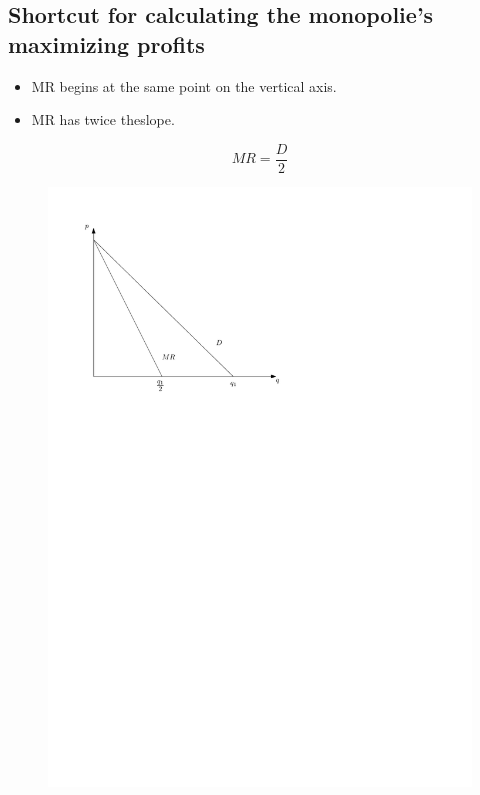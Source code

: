 \documentclass{article}
\begin{document}
\subsection{Shortcut for calculating the monopolie's maximizing profits}
\begin{itemize}
    \item MR begins at the same point on the vertical axis. 
    \item MR has twice theslope.
\end{itemize}
\[
  MR = \frac{D}{2} 
\]
\begin{figure}[!htb]
    \centering
    \includegraphics[]{figs/shortcut} 
\end{figure}


\end{document}
